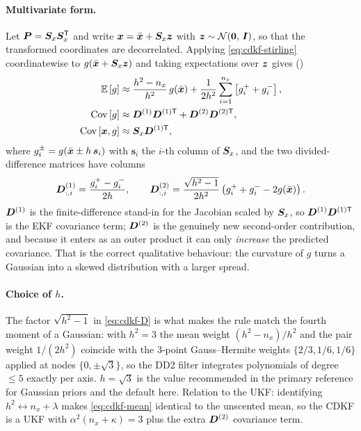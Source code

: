 \paragraph{Multivariate form.} Let $\bm{P} = \bm{S}_x\bm{S}_x^{\mathsf{T}}$ and write $\bm{x} = \bar{\bm{x}} + \bm{S}_x\bm{z}$
with $\bm{z} \sim \mathcal{N}\!\left(\bm0,\,\bm{I}\right)$, so that the transformed coordinates are decorrelated.
Applying \eqref{eq:cdkf-stirling} coordinatewise to $g(\bar{\bm{x}} + \bm{S}_x\bm{z})$ and taking
expectations over $\bm{z}$ gives (\cite[Eqs.~(30)--(34)]{norgaard2000})
\begin{align}
\mathbb{E}\left[g\right] &\approx \frac{h^2-n_x}{h^2}\,g(\bar{\bm{x}})
 + \frac{1}{2h^2}\sum_{i=1}^{n_x}\left[g_i^+ + g_i^-\right],
\label{eq:cdkf-mean}\\
\operatorname{Cov}\left[g\right] &\approx \bm{D}^{(1)}\bm{D}^{(1)\mathsf{T}} + \bm{D}^{(2)}\bm{D}^{(2)\mathsf{T}},
\label{eq:cdkf-cov}\\
\operatorname{Cov}\left[\bm{x},g\right] &\approx \bm{S}_x \bm{D}^{(1)\mathsf{T}},
\label{eq:cdkf-cross}
\end{align}
where $g_i^\pm = g(\bar{\bm{x}} \pm h\,\bm{s}_i)$ with $\bm{s}_i$ the $i$-th column of $\bm{S}_x$, and
the two divided-difference matrices have columns
\begin{equation}
\bm{D}^{(1)}_{:,i} = \frac{g_i^+-g_i^-}{2h}, \qquad
\bm{D}^{(2)}_{:,i} = \frac{\sqrt{h^2-1}}{2h^2}\left(g_i^+ + g_i^- - 2g(\bar{\bm{x}})\right).
\label{eq:cdkf-D}
\end{equation}
$\bm{D}^{(1)}$ is the finite-difference stand-in for the Jacobian scaled by $\bm{S}_x$, so
$\bm{D}^{(1)}\bm{D}^{(1)\mathsf{T}}$ is the EKF covariance term; $\bm{D}^{(2)}$ is the genuinely new
second-order contribution, and because it enters as an outer product it can only
\emph{increase} the predicted covariance. That is the correct qualitative behaviour: the
curvature of $g$ turns a Gaussian into a skewed distribution with a larger spread.

\paragraph{Choice of $h$.} The factor $\sqrt{h^2-1}$ in \eqref{eq:cdkf-D} is what makes the
rule match the fourth moment of a Gaussian: with $h^2 = 3$ the mean weight
$(h^2-n_x)/h^2$ and the pair weight $1/(2h^2)$ coincide with the $3$-point Gauss--Hermite
weights $\{2/3, 1/6, 1/6\}$ applied at nodes $\{0,\pm\sqrt3\}$, so the DD2 filter integrates
polynomials of degree $\le 5$ exactly per axis. $h = \sqrt3$ is the value recommended in the
primary reference for Gaussian priors and the default here. Relation to the UKF: identifying
$h^2 \leftrightarrow n_x+\lambda$ makes \eqref{eq:cdkf-mean} identical to the unscented mean,
so the CDKF is a UKF with $\alpha^2(n_x+\kappa)=3$ plus the extra $\bm{D}^{(2)}$ covariance
term.

